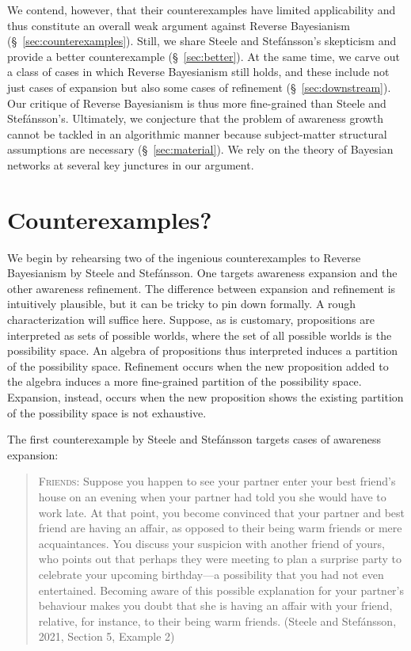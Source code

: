 \documentclass[
  11pt,
  dvipsnames,enabledeprecatedfontcommands]{scrartcl}
\begin{document}
We contend, however, that their counterexamples have limited
applicability and thus constitute an overall weak argument against
Reverse Bayesianism (\S ~\ref{sec:counterexamples}). Still, we share
Steele and Stefánsson's skepticism and provide a better counterexample
(\S ~\ref{sec:better}). At the same time, we carve out a class of cases
in which Reverse Bayesianism still holds, and these include not just
cases of expansion but also some cases of refinement
(\S ~\ref{sec:downstream}). Our critique of Reverse Bayesianism is thus
more fine-grained than Steele and Stefánsson's. Ultimately, we
conjecture that the problem of awareness growth cannot be tackled in an
algorithmic manner because subject-matter structural assumptions are
necessary (\S ~\ref{sec:material}). We rely on the theory of Bayesian
networks at several key junctures in our argument.

\hypertarget{counterexamples}{%
\section{Counterexamples?}\label{counterexamples}}

\label{sec:counterexamples}

We begin by rehearsing two of the ingenious counterexamples to Reverse
Bayesianism by Steele and Stefánsson. One targets awareness expansion
and the other awareness refinement. The difference between expansion and
refinement is intuitively plausible, but it can be tricky to pin down
formally. A rough characterization will suffice here. Suppose, as is
customary, propositions are interpreted as sets of possible worlds,
where the set of all possible worlds is the possibility space. An
algebra of propositions thus interpreted induces a partition of the
possibility space. Refinement occurs when the new proposition added to
the algebra induces a more fine-grained partition of the possibility
space. Expansion, instead, occurs when the new proposition shows the
existing partition of the possibility space is not exhaustive.

The first counterexample by Steele and Stefánsson targets cases of
awareness expansion:

\begin{quote}
\textsc{Friends}: Suppose you happen to see your partner enter your best
friend's house on an evening when your partner had told you she would
have to work late. At that point, you become convinced that your partner
and best friend are having an affair, as opposed to their being warm
friends or mere acquaintances. You discuss your suspicion with another
friend of yours, who points out that perhaps they were meeting to plan a
surprise party to celebrate your upcoming birthday---a possibility that
you had not even entertained. Becoming aware of this possible
explanation for your partner's behaviour makes you doubt that she is
having an affair with your friend, relative, for instance, to their
being warm friends. (Steele and Stefánsson, 2021, Section 5, Example 2)
\end{quote}
\end{document}
